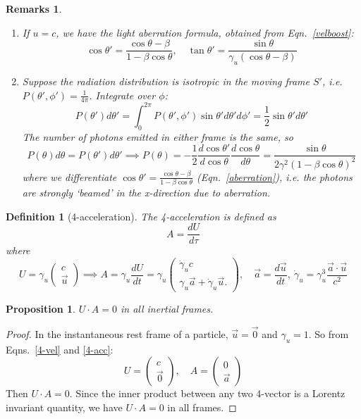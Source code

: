 \documentclass[a4paper]{article}
\newtheorem{remarks}{Remarks}[section]
\theoremstyle{new}
\newtheorem{defi}{Definition}[section]
\newtheorem{prop}{Proposition}[section]
\begin{document}
\begin{remarks}\leavevmode
\begin{enumerate}
\item If $u=c$, we have the light aberration formula, obtained from Eqn.~\ref{velboost}:
\begin{equation}
\cos\theta'=\frac{\cos\theta-\beta}{1-\beta \cos\theta},\quad\tan\theta'=\frac{\sin\theta}{\gamma_u(\cos\theta-\beta)}\label{aberration}
\end{equation}
\item Suppose the radiation distribution is isotropic in the moving frame $S'$, i.e. $P(\theta',\phi')=\frac{1}{4\pi}$. Integrate over $\phi$:
$$P(\theta')d\theta'=\int_0^{2\pi}P(\theta',\phi')\sin\theta'd\theta'd\phi'=\frac{1}{2}\sin\theta'd\theta'$$
The number of photons emitted in either frame is the same, so
$$P(\theta)d\theta=P(\theta')d\theta'\implies P(\theta)=-\frac{1}{2}\frac{d\cos\theta'}{d\cos\theta}\frac{d\cos\theta}{d\theta}=\frac{\sin\theta}{2\gamma^2(1-\beta\cos\theta)^2}$$
where we differentiate $\cos\theta'=\frac{\cos\theta-\beta}{1-\beta\cos\theta}$ (Eqn.~\ref{aberration}), i.e. the photons are strongly ‘beamed’ in the x-direction due to aberration.
\end{enumerate}
\end{remarks}
\begin{defi}[4-acceleration]
The 4-acceleration is defined as
$$ A = \frac{d U}{d \tau}$$
where
\begin{equation}
U = \gamma_u
  \begin{pmatrix}
    c\\
    \vec{u}
  \end{pmatrix}
\implies A = \gamma_u \frac{d U}{d t} = \gamma_u
  \begin{pmatrix}
    \dot{\gamma}_u c\\
    \gamma_u \vec{a} + \dot{\gamma}_u \vec{u}.
  \end{pmatrix},\quad
\vec{a} = \frac{d \vec{u}}{d t},~\dot{\gamma}_u = \gamma_u^3 \frac{\vec{a}\cdot \vec{u}}{c^2}\label{4-acc}
\end{equation}
\end{defi}
\begin{prop}
$U\cdot A=0$ in all inertial frames.
\end{prop}
\begin{proof}
In the instantaneous rest frame of a particle, $\vec{u} = \vec{0}$ and $\gamma_u = 1$. So from Eqns.~\ref{4-vel} and \ref{4-acc}:
$$U =
  \begin{pmatrix}
    c\\
    \vec{0}
  \end{pmatrix}, \quad
  A =
  \begin{pmatrix}
    0\\
    \vec{a}
  \end{pmatrix}$$
Then $U\cdot A = 0$. Since the inner product between any two 4-vector is a Lorentz invariant quantity, we have $U\cdot A = 0$ in all frames.
\end{proof}
\end{document}
